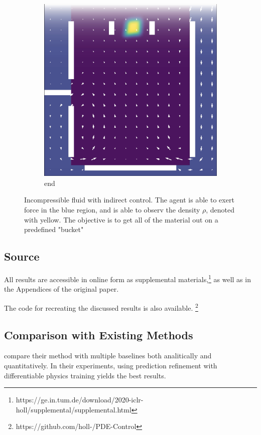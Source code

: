 \documentclass[acmtog]{techreportacmart}
\begin{document}
\begin{figure}
\begin{subfigure}{0.15\textwidth}
    \caption{}
    \label{fig:indirect-b}
  \end{subfigure}
  \begin{subfigure}{0.15\textwidth}
    \centering
    \includegraphics[width=\textwidth]{indirect_end.png}
    \caption{end}
    \label{fig:indirect-c}
  \end{subfigure}
  \caption{Incompressible fluid with indirect control. The agent is able to
  exert force in the blue region, and is able to observ the density $\rho$,
  denoted with yellow. The objective is to get all of the material out on
  a predefined "bucket"}
\end{figure}

\subsection{Source}
All results are accessible in online form as supplemental materials,\footnote{https://ge.in.tum.de/download/2020-iclr-holl/supplemental/supplemental.html}
as well as in the Appendices of the original paper.

The code for recreating the discussed results is also available.
\footnote{https://github.com/holl-/PDE-Control}

\subsection{Comparison with Existing Methods}
\cite{ControlPDEs} compare their method with multiple baselines both
analitically and quantitatively. In their experiments, using prediction
refinement with differentiable physics training yields the best results. 
\end{document}
